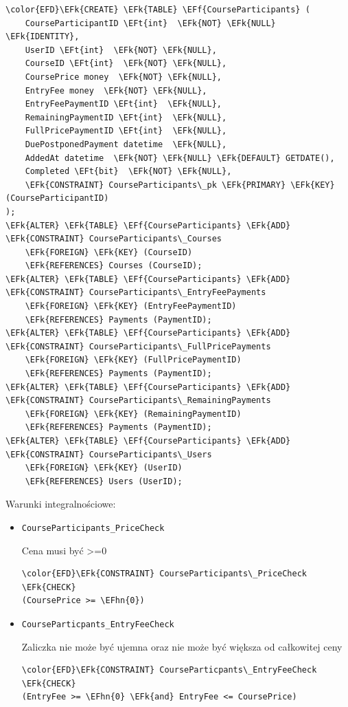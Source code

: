 \documentclass[11pt]{article}
\newcommand{\EFk}[1]{\textcolor{EFk}{\textbf{#1}}} %
\newcommand{\EFf}[1]{\textcolor{EFf}{#1}} %
\newcommand{\EFt}[1]{\textcolor{EFt}{\textbf{#1}}} %
\newcommand{\EFhn}[1]{\textcolor{EFhn}{#1}} %
\begin{document}
\begin{Code}
\begin{Verbatim}
\color{EFD}\EFk{CREATE} \EFk{TABLE} \EFf{CourseParticipants} (
    CourseParticipantID \EFt{int}  \EFk{NOT} \EFk{NULL} \EFk{IDENTITY},
    UserID \EFt{int}  \EFk{NOT} \EFk{NULL},
    CourseID \EFt{int}  \EFk{NOT} \EFk{NULL},
    CoursePrice money  \EFk{NOT} \EFk{NULL},
    EntryFee money  \EFk{NOT} \EFk{NULL},
    EntryFeePaymentID \EFt{int}  \EFk{NULL},
    RemainingPaymentID \EFt{int}  \EFk{NULL},
    FullPricePaymentID \EFt{int}  \EFk{NULL},
    DuePostponedPayment datetime  \EFk{NULL},
    AddedAt datetime  \EFk{NOT} \EFk{NULL} \EFk{DEFAULT} GETDATE(),
    Completed \EFt{bit}  \EFk{NOT} \EFk{NULL},
    \EFk{CONSTRAINT} CourseParticipants\_pk \EFk{PRIMARY} \EFk{KEY}  (CourseParticipantID)
);
\EFk{ALTER} \EFk{TABLE} \EFf{CourseParticipants} \EFk{ADD} \EFk{CONSTRAINT} CourseParticipants\_Courses
    \EFk{FOREIGN} \EFk{KEY} (CourseID)
    \EFk{REFERENCES} Courses (CourseID);
\EFk{ALTER} \EFk{TABLE} \EFf{CourseParticipants} \EFk{ADD} \EFk{CONSTRAINT} CourseParticipants\_EntryFeePayments
    \EFk{FOREIGN} \EFk{KEY} (EntryFeePaymentID)
    \EFk{REFERENCES} Payments (PaymentID);
\EFk{ALTER} \EFk{TABLE} \EFf{CourseParticipants} \EFk{ADD} \EFk{CONSTRAINT} CourseParticipants\_FullPricePayments
    \EFk{FOREIGN} \EFk{KEY} (FullPricePaymentID)
    \EFk{REFERENCES} Payments (PaymentID);
\EFk{ALTER} \EFk{TABLE} \EFf{CourseParticipants} \EFk{ADD} \EFk{CONSTRAINT} CourseParticipants\_RemainingPayments
    \EFk{FOREIGN} \EFk{KEY} (RemainingPaymentID)
    \EFk{REFERENCES} Payments (PaymentID);
\EFk{ALTER} \EFk{TABLE} \EFf{CourseParticipants} \EFk{ADD} \EFk{CONSTRAINT} CourseParticipants\_Users
    \EFk{FOREIGN} \EFk{KEY} (UserID)
    \EFk{REFERENCES} Users (UserID);
\end{Verbatim}
\end{Code}
Warunki integralnościowe:


\begin{itemize}
\item \texttt{CourseParticipants\_PriceCheck}

Cena musi być >=0
\begin{Code}
\begin{Verbatim}
\color{EFD}\EFk{CONSTRAINT} CourseParticipants\_PriceCheck \EFk{CHECK}
(CoursePrice >= \EFhn{0})
\end{Verbatim}
\end{Code}
\item \texttt{CourseParticpants\_EntryFeeCheck}

Zaliczka nie może być ujemna oraz nie może być większa od całkowitej ceny
\begin{Code}
\begin{Verbatim}
\color{EFD}\EFk{CONSTRAINT} CourseParticpants\_EntryFeeCheck \EFk{CHECK}
(EntryFee >= \EFhn{0} \EFk{and} EntryFee <= CoursePrice)
\end{Verbatim}
\end{Code}
\end{itemize}
\end{document}
